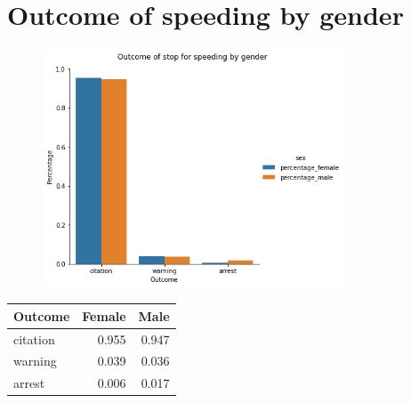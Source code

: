 \documentclass{article}
\begin{document}
\section{Outcome of speeding by gender}
 \begin{figure}
\includegraphics[width=0.8\textwidth]{../figures/speeding_outcome_gender.png}
\end{figure}

\begin{tabular}{lrr}
\toprule
 Outcome & Female &  Male \\
\midrule
citation &  0.955 & 0.947 \\
 warning &  0.039 & 0.036 \\
  arrest &  0.006 & 0.017 \\
\bottomrule
\end{tabular}

\FloatBarrier
\end{document}
